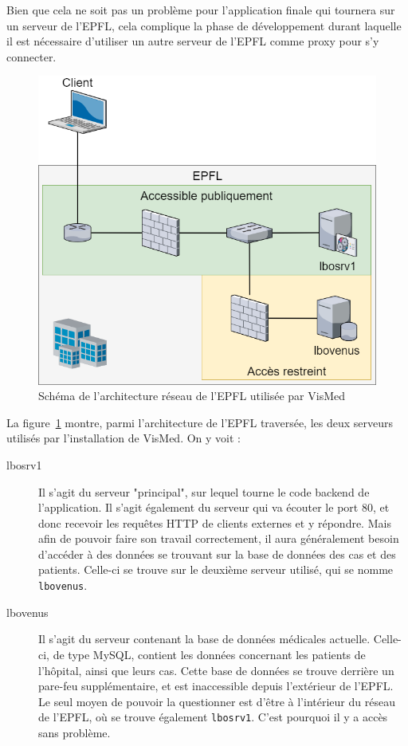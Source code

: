 		Bien que cela ne soit pas un problème pour l'application finale qui tournera sur un serveur de l'EPFL, cela complique la phase de développement durant laquelle il est nécessaire d'utiliser un autre serveur de l'EPFL comme proxy pour s'y connecter.

		\begin{figure}[h]
			\centering
			\includegraphics[width=1\textwidth]{images/realisation/Schema_EPFL}
			\caption{Schéma de l'architecture réseau de l'EPFL utilisée par VisMed}
			\label{schema-epfl}
		\end{figure}

		La figure~\ref{schema-epfl} montre, parmi l'architecture de l'EPFL traversée, les deux serveurs utilisés par l'installation de VisMed. On y voit :
		\begin{description}
			\item[lbosrv1] Il s'agit du serveur "principal", sur lequel tourne le code backend de l'application. Il s'agit également du serveur qui va écouter le port 80, et donc recevoir les requêtes HTTP de clients externes et y répondre. Mais afin de pouvoir faire son travail correctement, il aura généralement besoin d'accéder à des données se trouvant sur la base de données des cas et des patients. Celle-ci se trouve sur le deuxième serveur utilisé, qui se nomme \texttt{lbovenus}.
			\item[lbovenus] Il s'agit du serveur contenant la base de données médicales actuelle. Celle-ci, de type MySQL, contient les données concernant les patients de l'hôpital, ainsi que leurs cas. Cette base de données se trouve derrière un pare-feu supplémentaire, et est inaccessible depuis l'extérieur de l'EPFL. Le seul moyen de pouvoir la questionner est d'être à l'intérieur du réseau de l'EPFL, où se trouve également \texttt{lbosrv1}. C'est pourquoi il y a accès sans problème.
		\end{description}

